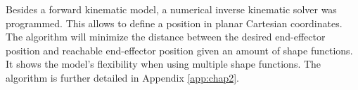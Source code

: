 Besides a forward kinematic model, a numerical inverse kinematic solver was programmed. This allows to define a position in planar Cartesian coordinates. The algorithm will minimize the distance between the desired end-effector position and reachable end-effector position given an amount of shape functions. It shows the model's flexibility when using multiple shape functions. The algorithm is further detailed in Appendix \ref{app:chap2}. 

\clearpage








